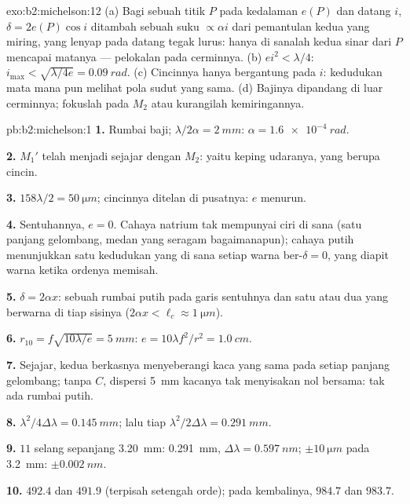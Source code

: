 \begin{solution}{exo:b2:michelson:12}
(a) Bagi sebuah titik $P$ pada kedalaman $e(P)$ dan datang $i$, $\delta = 2e(P)\cos i$
ditambah sebuah suku $\propto\alpha i$ dari pemantulan kedua yang miring, yang
lenyap pada datang tegak lurus: hanya di sanalah kedua sinar dari $P$ mencapai
matanya --- pelokalan pada cerminnya. (b) $ei^2 < \lambda/4$: $i_{\max} <
\sqrt{\lambda/4e} = \qty{0.09}{rad}$. (c) Cincinnya hanya bergantung pada $i$: kedudukan mata
mana pun melihat pola sudut yang sama. (d) Bajinya dipandang di luar
cerminnya; fokuslah pada $M_2$ atau kurangilah kemiringannya.
\end{solution}

\begin{solution}{pb:b2:michelson:1}
\textbf{1.} Rumbai baji; $\lambda/2\alpha = \qty{2}{mm}$: $\alpha = \qty{1.6e-4}{rad}$.

\textbf{2.} $M_1'$ telah menjadi sejajar dengan $M_2$: yaitu keping udaranya, yang
 berupa cincin.

\textbf{3.} $158\lambda/2 = \qty{50}{\micro m}$; cincinnya ditelan di pusatnya: $e$
menurun.

\textbf{4.} Sentuhannya, $e = 0$. Cahaya natrium tak mempunyai ciri di sana (satu
panjang gelombang, medan yang seragam bagaimanapun); cahaya putih menunjukkan satu
kedudukan yang di sana setiap warna ber-$\delta = 0$, yang diapit warna ketika
ordenya memisah.

\textbf{5.} $\delta = 2\alpha x$: sebuah rumbai putih pada garis sentuhnya dan satu atau
dua yang berwarna di tiap sisinya ($2\alpha x < \ell_c \approx \qty{1}{\micro m}$).

\textbf{6.} $r_{10} = f\sqrt{10\lambda/e} = \qty{5}{mm}$: $e = 10\lambda f^2/r^2 = \qty{1.0}{cm}$.

\textbf{7.} Sejajar, kedua berkasnya menyeberangi kaca yang sama pada setiap
panjang gelombang; tanpa $C$, dispersi \qty{5}{mm} kacanya tak menyisakan
nol bersama: tak ada rumbai putih.

\textbf{8.} $\lambda^2/4\Delta\lambda = \qty{0.145}{mm}$; lalu tiap $\lambda^2/2\Delta\lambda = \qty{0.291}{mm}$.

\textbf{9.} $11$ selang sepanjang \qty{3.20}{mm}: \qty{0.291}{mm}, $\Delta\lambda = \qty{0.597}{nm}$;
$\pm\qty{10}{\micro m}$ pada \qty{3.2}{mm}: $\pm\qty{0.002}{nm}$.

\textbf{10.} $492.4$ dan $491.9$ (terpisah setengah orde); pada kembalinya,
$984.7$ dan $983.7$.


\end{solution}
